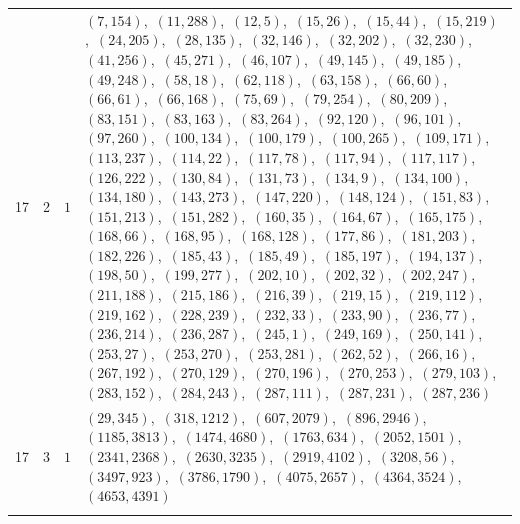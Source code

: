 \documentclass[11pt]{article}
\begin{document}
\begin{longtable}{@{}rrl>{\raggedright\arraybackslash}p{}@{}}
17 & 2 & $1$ & $(7,154)$,\allowbreak\ $(11,288)$,\allowbreak\ $(12,5)$,\allowbreak\ $(15,26)$,\allowbreak\ $(15,44)$,\allowbreak\ $(15,219)$,\allowbreak\ $(24,205)$,\allowbreak\ $(28,135)$,\allowbreak\ $(32,146)$,\allowbreak\ $(32,202)$,\allowbreak\ $(32,230)$,\allowbreak\ $(41,256)$,\allowbreak\ $(45,271)$,\allowbreak\ $(46,107)$,\allowbreak\ $(49,145)$,\allowbreak\ $(49,185)$,\allowbreak\ $(49,248)$,\allowbreak\ $(58,18)$,\allowbreak\ $(62,118)$,\allowbreak\ $(63,158)$,\allowbreak\ $(66,60)$,\allowbreak\ $(66,61)$,\allowbreak\ $(66,168)$,\allowbreak\ $(75,69)$,\allowbreak\ $(79,254)$,\allowbreak\ $(80,209)$,\allowbreak\ $(83,151)$,\allowbreak\ $(83,163)$,\allowbreak\ $(83,264)$,\allowbreak\ $(92,120)$,\allowbreak\ $(96,101)$,\allowbreak\ $(97,260)$,\allowbreak\ $(100,134)$,\allowbreak\ $(100,179)$,\allowbreak\ $(100,265)$,\allowbreak\ $(109,171)$,\allowbreak\ $(113,237)$,\allowbreak\ $(114,22)$,\allowbreak\ $(117,78)$,\allowbreak\ $(117,94)$,\allowbreak\ $(117,117)$,\allowbreak\ $(126,222)$,\allowbreak\ $(130,84)$,\allowbreak\ $(131,73)$,\allowbreak\ $(134,9)$,\allowbreak\ $(134,100)$,\allowbreak\ $(134,180)$,\allowbreak\ $(143,273)$,\allowbreak\ $(147,220)$,\allowbreak\ $(148,124)$,\allowbreak\ $(151,83)$,\allowbreak\ $(151,213)$,\allowbreak\ $(151,282)$,\allowbreak\ $(160,35)$,\allowbreak\ $(164,67)$,\allowbreak\ $(165,175)$,\allowbreak\ $(168,66)$,\allowbreak\ $(168,95)$,\allowbreak\ $(168,128)$,\allowbreak\ $(177,86)$,\allowbreak\ $(181,203)$,\allowbreak\ $(182,226)$,\allowbreak\ $(185,43)$,\allowbreak\ $(185,49)$,\allowbreak\ $(185,197)$,\allowbreak\ $(194,137)$,\allowbreak\ $(198,50)$,\allowbreak\ $(199,277)$,\allowbreak\ $(202,10)$,\allowbreak\ $(202,32)$,\allowbreak\ $(202,247)$,\allowbreak\ $(211,188)$,\allowbreak\ $(215,186)$,\allowbreak\ $(216,39)$,\allowbreak\ $(219,15)$,\allowbreak\ $(219,112)$,\allowbreak\ $(219,162)$,\allowbreak\ $(228,239)$,\allowbreak\ $(232,33)$,\allowbreak\ $(233,90)$,\allowbreak\ $(236,77)$,\allowbreak\ $(236,214)$,\allowbreak\ $(236,287)$,\allowbreak\ $(245,1)$,\allowbreak\ $(249,169)$,\allowbreak\ $(250,141)$,\allowbreak\ $(253,27)$,\allowbreak\ $(253,270)$,\allowbreak\ $(253,281)$,\allowbreak\ $(262,52)$,\allowbreak\ $(266,16)$,\allowbreak\ $(267,192)$,\allowbreak\ $(270,129)$,\allowbreak\ $(270,196)$,\allowbreak\ $(270,253)$,\allowbreak\ $(279,103)$,\allowbreak\ $(283,152)$,\allowbreak\ $(284,243)$,\allowbreak\ $(287,111)$,\allowbreak\ $(287,231)$,\allowbreak\ $(287,236)$\\
17 & 3 & $1$ & $(29,345)$,\allowbreak\ $(318,1212)$,\allowbreak\ $(607,2079)$,\allowbreak\ $(896,2946)$,\allowbreak\ $(1185,3813)$,\allowbreak\ $(1474,4680)$,\allowbreak\ $(1763,634)$,\allowbreak\ $(2052,1501)$,\allowbreak\ $(2341,2368)$,\allowbreak\ $(2630,3235)$,\allowbreak\ $(2919,4102)$,\allowbreak\ $(3208,56)$,\allowbreak\ $(3497,923)$,\allowbreak\ $(3786,1790)$,\allowbreak\ $(4075,2657)$,\allowbreak\ $(4364,3524)$,\allowbreak\ $(4653,4391)$\\
\addlinespace[3pt]
\end{longtable}
\endgroup
\end{document}
